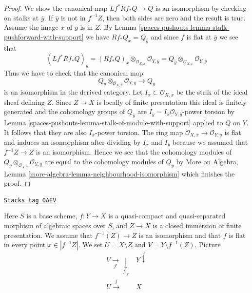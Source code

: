 \begin{proof}
We show the canonical map $Lf^*Rf_*Q \to Q$ is an isomorphism
by checking on stalks at $\overline{y}$. If $\overline{y}$ is not
in $f^{-1}Z$, then both sides are zero and the result is true.
Assume the image $\overline{x}$ of $\overline{y}$ is in $Z$.
By Lemma \ref{spaces-pushouts-lemma-stalk-pushforward-with-support} we have
$Rf_*Q_{\overline{x}} = Q_{\overline{y}}$ and since $f$ is flat
at $\overline{y}$ we see that
$$
(Lf^*Rf_*Q)_{\overline{y}} =
(Rf_*Q)_{\overline{x}}
\otimes_{\mathcal{O}_{X, \overline{x}}}
\mathcal{O}_{Y, \overline{y}} =
Q_{\overline{y}} \otimes_{\mathcal{O}_{X, \overline{x}}}
\mathcal{O}_{Y, \overline{y}}
$$
Thus we have to check that the canonical map
$$
Q_{\overline{y}} \otimes_{\mathcal{O}_{X, \overline{x}}}
\mathcal{O}_{Y, \overline{y}}
\longrightarrow Q_{\overline{y}}
$$
is an isomorphism in the derived category. Let
$I_{\overline{x}} \subset \mathcal{O}_{X, \overline{x}}$ be the
stalk of the ideal sheaf defining $Z$. Since $Z \to X$ is locally of
finite presentation this ideal is finitely generated and the
cohomology groups of $Q_{\overline{y}}$
are $I_{\overline{y}} = I_{\overline{x}}\mathcal{O}_{Y, \overline{y}}$-power
torsion by Lemma \ref{spaces-pushouts-lemma-stalk-of-module-with-support} applied to $Q$ on $Y$.
It follows that they are also $I_{\overline{x}}$-power torsion.
The ring map
$\mathcal{O}_{X, \overline{x}} \to \mathcal{O}_{Y, \overline{y}}$
is flat and induces an isomorphism after dividing by
$I_{\overline{x}}$ and $I_{\overline{y}}$ because we assumed
that $f^{-1}Z \to Z$ is an isomorphism. Hence we see that
the cohomology modules of
$Q_{\overline{y}} \otimes_{\mathcal{O}_{X, \overline{x}}}
\mathcal{O}_{Y, \overline{y}}$
are equal to the cohomology modules of $Q_{\overline{y}}$ by
More on Algebra, Lemma \ref{more-algebra-lemma-neighbourhood-isomorphism}
which finishes the proof.
\end{proof}

\begin{definition}
\label{spaces-pushouts-situation-formal-glueing}
\href{https://stacks.math.columbia.edu/tag/0AEV}{\texttt{Stacks tag 0AEV}}

Here $S$ is a base scheme, $f : Y \to X$ is a quasi-compact
and quasi-separated morphism of algebraic spaces over $S$, and
$Z \to X$ is a closed immersion of finite presentation. We assume that
$f^{-1}(Z) \to Z$ is an isomorphism and that $f$ is flat in every
point $x \in |f^{-1}Z|$. We set $U = X \setminus Z$ and
$V = Y \setminus f^{-1}(Z)$.
Picture
$$
\begin{array}{cc}V \underset{j'}{\longrightarrow}\underset{f|_V}{\downarrow} & Y \overset{f}{\downarrow} \\ U \overset{j}{\longrightarrow} & X\end{array}
$$
\end{definition}

